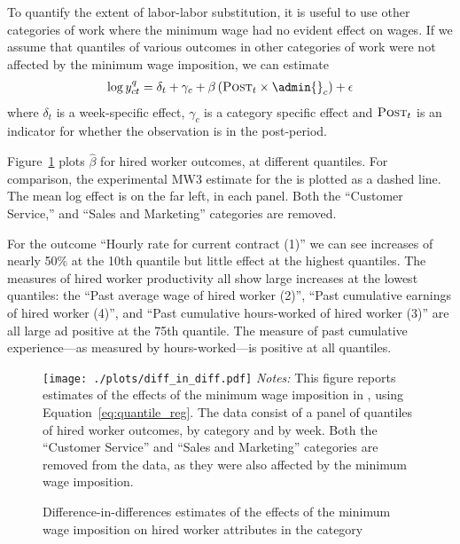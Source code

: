 To quantify the extent of labor-labor substitution, it is useful to use other categories of work where the minimum wage had no evident effect on wages.  
If we assume that quantiles of various outcomes in other categories of work were not affected by the minimum wage imposition, we can estimate 
\begin{align} \label{eq:quantile_reg}
  \log y^q_{ct} = \delta_t + \gamma_c + \beta \left(\textsc{Post}_{t} \times \admin{}_c \right) + \epsilon
\end{align}
where $\delta_t$ is a week-specific effect, $\gamma_c$ is a category specific effect and $\textsc{Post}_t$ is an indicator for whether the observation is in the post-period.

Figure~\ref{fig:diff_in_diff} plots $\hat{\beta}$ for hired worker outcomes, at different quantiles.
For comparison, the experimental MW3 estimate for the \admin{} is plotted as a dashed line.
The mean log effect is on the far left, in each panel.
Both the ``Customer Service,'' and ``Sales and Marketing'' categories are removed. 

For the outcome ``Hourly rate for current contract (1)'' we can see increases of nearly 50\% at the 10th quantile but little effect at the highest quantiles.
The measures of hired worker productivity all show large increases at the lowest quantiles: the ``Past average wage of hired worker (2)'', ``Past cumulative earnings of hired worker (4)'',  and ``Past cumulative hours-worked of hired worker (3)'' are all large ad positive at the 75th quantile.
The measure of past cumulative experience---as measured by hours-worked---is positive at all quantiles.

\begin{figure}[h!]
\centering 
\caption{Difference-in-differences estimates of the effects of the minimum wage imposition on hired worker attributes in the \admin{} category} \label{fig:diff_in_diff} 
\begin{minipage}{1.0 \linewidth}
\texttt{[image: ./plots/diff\_in\_diff.pdf]} 
{\footnotesize
  \emph{Notes:} This figure reports estimates of the effects of the minimum wage imposition in \admin{}, using Equation~\ref{eq:quantile_reg}.
  The data consist of a panel of quantiles of hired worker outcomes, by category and by week.
  Both the ``Customer Service'' and ``Sales and Marketing'' categories are removed from the data, as they were also affected by the minimum wage imposition. 
}
\end{minipage} 
\end{figure} 
